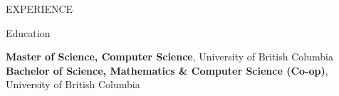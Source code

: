 \documentclass{resume} %
\begin{document}
\begin{rSection}{EXPERIENCE}
\end{rSection} 


\begin{rSection}{Education}

{\bf Master of Science, Computer Science}, University of British Columbia \hfill {}\\
{\bf Bachelor of Science, Mathematics \& Computer Science (Co-op)}, University of British Columbia \hfill {}

\end{rSection}
\end{document}
